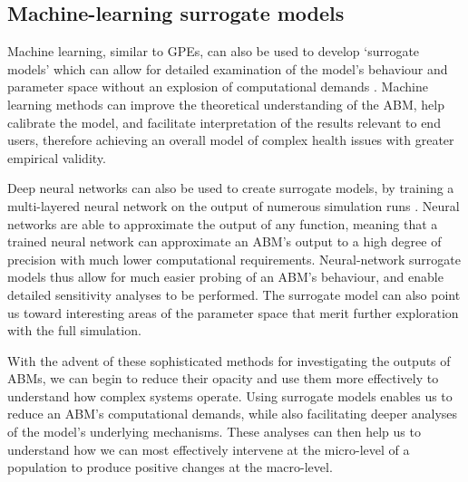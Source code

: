 \documentclass[review]{elsarticle}
\begin{document}
\subsection{Machine-learning surrogate models}
 

Machine learning, similar to GPEs, can also be used to develop `surrogate models' which can allow for detailed examination of the model's behaviour and parameter space without an explosion of computational demands \citep{pereda2017brief,lamperti2017agent}.  Machine learning methods can improve the theoretical understanding of the ABM, help calibrate the model, and facilitate interpretation of the results relevant to end users, therefore achieving an overall model of complex health issues with greater empirical validity.   

Deep neural networks can also be used to create surrogate models, by training a multi-layered neural network on the output of numerous simulation runs \citep{van2017deep}. Neural networks are able to approximate the output of any function, meaning that a trained neural network can approximate an ABM's output to a high degree of precision with much lower computational requirements.  Neural-network surrogate models thus allow for much easier probing of an ABM's behaviour, and enable detailed sensitivity analyses to be performed.  The surrogate model can also point us toward interesting areas of the parameter space that merit further exploration with the full simulation.

With the advent of these sophisticated methods for investigating the outputs of ABMs, we can begin to reduce their opacity and use them more effectively to understand how complex systems operate.  Using surrogate models enables us to reduce an ABM's computational demands, while also facilitating deeper analyses of the model's underlying mechanisms.  These analyses can then help us to understand how we can most effectively intervene at the micro-level of a population to produce positive changes at the macro-level.
\end{document}
